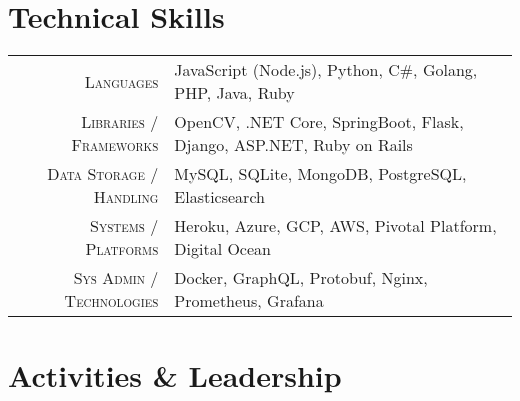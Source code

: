 \documentclass[a4paper,10pt]{extarticle} %
\begin{document}
\section{\textcolor{primary}{Technical Skills}}

\begin{tabular}{r|p{15cm}}
\textsc{Languages} & JavaScript (Node.js), Python, C#, Golang, PHP, Java, Ruby \\
\textsc{Libraries / Frameworks} & OpenCV, .NET Core, SpringBoot, Flask, Django, ASP.NET, Ruby on Rails \\
\textsc{Data Storage / Handling} & MySQL, SQLite, MongoDB, PostgreSQL, Elasticsearch \\
\textsc{Systems / Platforms} & Heroku, Azure, GCP, AWS, Pivotal Platform, Digital Ocean \\
\textsc{Sys Admin / Technologies} & Docker, GraphQL, Protobuf, Nginx, Prometheus, Grafana\\
\end{tabular}


\vspace{-0.2cm}
\section{\textcolor{primary}{Activities \& Leadership}}
\end{document}
